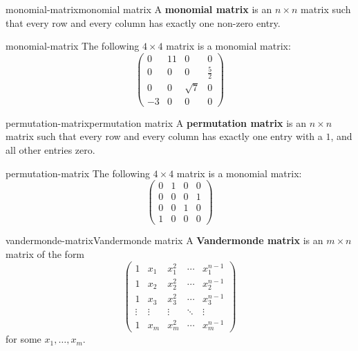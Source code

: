 \begin{topic}{monomial-matrix}{monomial matrix}
    A \textbf{monomial matrix} is an $n \times n$ matrix such that every row and every column has exactly one non-zero entry.
\end{topic}

\begin{example}{monomial-matrix}
    The following $4 \times 4$ matrix is a monomial matrix:
    \[ \begin{pmatrix} 0 & 11 & 0 & 0 \\ 0 & 0 & 0 & \frac{5}{2} \\ 0 & 0 & \sqrt{7} & 0 \\ -3 & 0 & 0 & 0 \end{pmatrix} \]
\end{example}

\begin{topic}{permutation-matrix}{permutation matrix}
    A \textbf{permutation matrix} is an $n \times n$ matrix such that every row and every column has exactly one entry with a $1$, and all other entries zero.
\end{topic}

\begin{example}{permutation-matrix}
    The following $4 \times 4$ matrix is a monomial matrix:
    \[ \begin{pmatrix} 0 & 1 & 0 & 0 \\ 0 & 0 & 0 & 1 \\ 0 & 0 & 1 & 0 \\ 1 & 0 & 0 & 0 \end{pmatrix} \]
\end{example}

\begin{topic}{vandermonde-matrix}{Vandermonde matrix}
    A \textbf{Vandermonde matrix} is an $m \times n$ matrix of the form
    \[ \begin{pmatrix} 1 & x_1 & x_1^2 & \cdots & x_1^{n - 1} \\ 1 & x_2 & x_2^2 & \cdots & x_2^{n - 1} \\ 1 & x_3 & x_3^2 & \cdots & x_3^{n - 1} \\ \vdots & \vdots & \vdots & \ddots & \vdots \\ 1 & x_m & x_m^2 & \cdots & x_m^{n - 1} \end{pmatrix} \]
    for some $x_1, \ldots, x_m$.
\end{topic}

